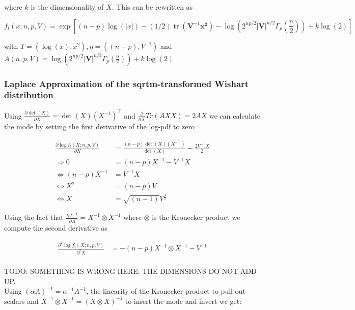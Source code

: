 where $k$ is the dimensionality of $X$. This can be rewritten as 

\begin{equation}
f_t(x; n,p,V) = \exp \left[(n-p) \log(|x|) - (1/2)\operatorname{tr}({\mathbf V}^{-1}\mathbf{x^2}) - \log\left(2^{np/2} \left|{\mathbf V}\right|^{n/2} \Gamma_p\left(\frac {n}{2}\right )\right) + k\log(2) \right]
\end{equation}

with $T=(\log(x), x^2), \eta=((n-p), V^{-1})$ and $A(n,p,V)=\log\left(2^{np/2} \left|{\mathbf V}\right|^{n/2} \Gamma_p\left(\frac {n}{2}\right )\right) + k\log(2)$


\subsubsection{Laplace Approximation of the sqrtm-transformed Wishart distribution}

Using $\frac{\partial \det(X)}{\partial X} = \det(X)(X^{-1})^\top$ and $\frac{\partial}{\partial X} Tr(AXX) = 2AX$ we can calculate the mode by setting the first derivative of the log-pdf to zero

\begin{align*}
\frac{\partial \log f_t(X; n,p,V)}{\partial X} &= \frac{(n-p)\det(X)(X^{-\top})}{\det(X)} - \frac{2V^{-1}X}{2} \\
\Rightarrow 0 &= (n-p)X^{-1} - V^{-1}X \\
\Leftrightarrow  (n-p)X^{-1} &= V^{-1}X \\
\Leftrightarrow X^2 &= (n-p)V \\
\Leftrightarrow X &= \sqrt{(n-1)} V^\frac{1}{2}
\end{align*}

Using the fact that $\frac{\partial A^{-1}}{\partial A} = X^{-1} \otimes X^{-1}$ where $\otimes$ is the Kronecker product we compute the second derivative as

\begin{align*}
\frac{\partial^2 \log f_t(X; n,p,V)}{\partial^2 X} &= -(n-p) X^{-1} \otimes X^{-1} - V^{-1} \\
\end{align*}

TODO: SOMETHING IS WRONG HERE: THE DIMENSIONS DO NOT ADD UP.\\

Using $(\alpha A)^{-1} = \alpha^{-1}A^{-1}$, the linearity of the Kronecker product to pull out scalars and $X^{-1} \otimes X^{-1} = (X \otimes X)^{-1}$ to insert the mode and invert we get:

